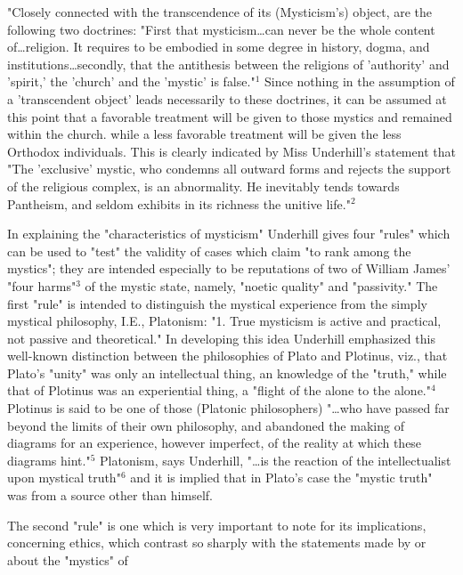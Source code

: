 "Closely connected with the transcendence of its (Mysticism's)
object, are the following two doctrines: "First that mysticism\dots can
never be the whole content of\dots religion. It requires
to be embodied in some degree in history, dogma, and
institutions\dots secondly, that the antithesis between the
religions of 'authority' and 'spirit,' the 'church' and
the 'mystic' is false."$^{1}$ Since nothing in the assumption
of a 'transcendent object' leads necessarily to these doctrines,
it can be assumed at this point that a favorable treatment
will be given to those mystics and remained within the
church. while a less favorable treatment will be
given the less Orthodox individuals. This is clearly indicated
by Miss Underhill's statement that "The 'exclusive' mystic,
who condemns all outward forms and rejects the support
of the religious complex, is an abnormality. He inevitably
tends towards Pantheism, and seldom exhibits in its richness
the unitive life."$^{2}$\par
\vspace*{0.5\baselineskip}
In explaining the "characteristics of mysticism" Underhill
gives four "rules" which can be used to "test" the
validity of cases which claim "to rank among the mystics";
they are intended especially to be reputations of two of
William James' "four harms"$^{3}$ of the mystic state, namely,
"noetic quality" and "passivity." The first "rule" is intended
to distinguish the mystical experience from the
simply mystical philosophy, I.E., Platonism: "1. True
mysticism is active and practical, not passive and theoretical."
In developing this idea Underhill emphasized this well-known
distinction between the philosophies of Plato and
Plotinus, viz., that Plato's "unity" was only an intellectual
thing, an knowledge of the "truth," while that of Plotinus
was an experiential thing, a "flight of the alone to the alone."$^{4}$
Plotinus is said to be one of those (Platonic
philosophers) "\dots who have passed far beyond the limits of
their own philosophy, and abandoned the making of diagrams
for an experience, however imperfect, of the reality at which
these diagrams hint."$^{5}$ Platonism, says Underhill, "\dots is the
reaction of the intellectualist upon mystical truth"$^{6}$ and it
is implied that in Plato's case the "mystic truth" was from
a source other than himself.\par
\vspace*{0.5\baselineskip}
The second "rule" is one which is very important to note
for its implications, concerning ethics, which contrast so
sharply with the statements made by or about the "mystics" of
